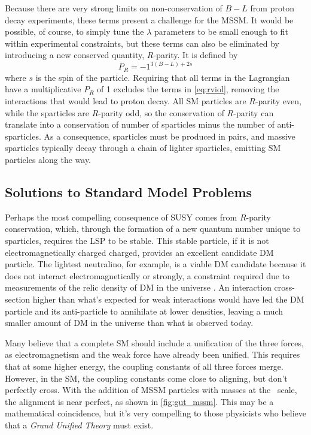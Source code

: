 Because there are very strong limits on non-conservation of $B-L$ from proton decay experiments, these terms present a challenge for the \ac{MSSM}. It would be possible, of course, to simply tune the $\lambda$ parameters to be small enough to fit within experimental constraints, but these terms can also be eliminated by introducing a new conserved quantity, $R$-parity. It is defined by
%
\begin{equation}
P_R = -1^{3(B-L)+2s}
\end{equation}
%
where $s$ is the spin of the particle. Requiring that all terms in the Lagrangian have a multiplicative $P_R$ of 1 excludes the terms in \autoref{eq:rviol}, removing the interactions that would lead to proton decay. All \ac{SM} particles are $R$-parity even, while the sparticles are $R$-parity odd, so the conservation of $R$-parity can translate into a conservation of number of sparticles minus the number of anti-sparticles. As a consequence, sparticles must be produced in pairs, and massive sparticles typically decay through a chain of lighter sparticles, emitting \ac{SM} particles along the way.  

\subsection{Solutions to Standard Model Problems}

Perhaps the most compelling consequence of \ac{SUSY} comes from $R$-parity conservation, which, through the formation of a new quantum number u\-nique to sparticles, requires the \acf{LSP} to be stable. This stable particle, if it is not electromagnetically charged charged, provides an excellent candidate \ac{DM} particle. The lightest neutralino, for example, is a viable \ac{DM} candidate because it does not interact electromagnetically or strongly, a constraint required due to measurements of the relic density of \ac{DM} in the universe \cite{astro-ph/9407006}. An interaction cross-section higher than what's expected for weak interactions would have led the \ac{DM} particle and its anti-particle to annihilate at lower densities, leaving a much smaller amount of \ac{DM} in the universe than what is observed today.

Many believe that a complete \ac{SM} should include a unification of the three forces, as electromagnetism and the weak force have already been unified. This requires that at some higher energy, the coupling constants of all three forces merge. However, in the \ac{SM}, the coupling constants come close to aligning, but don't perfectly cross. With the addition of \ac{MSSM} particles with masses at the \tev~scale, the alignment is near perfect, as shown in \autoref{fig:gut_mssm}. This may be a mathematical coincidence, but it's very compelling to those physicists who believe that a \textit{Grand Unified Theory} must exist. 

